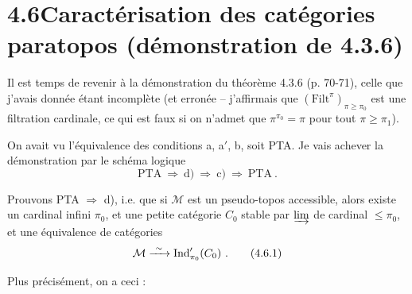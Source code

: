 \section*{4.6\quad Caractérisation des catégories paratopos (démonstration de 4.3.6)}

Il est temps de revenir à la démonstration du théorème 4.3.6 (p. 70-71), celle que j'avais donnée étant incomplète (et erronée – j'affirmais que $(\mathrm{Filt}^{\pi})_{\pi\geqslant\pi_0}$ est une filtration cardinale, ce qui est faux si on n'admet que $\pi^{\pi_0}=\pi$ pour tout $\pi\geqslant\pi_1$).

On avait vu l'équivalence des conditions a, a$'$, b, soit PTA. Je vais achever la démonstration par le schéma logique
\[
\text{PTA} \ \Longrightarrow\ \text{d)} \ \Longrightarrow\ \text{c)} \ \Longrightarrow\ \text{PTA}\ . \tag*{$(*)$}
\]

Prouvons PTA $\Longrightarrow$ d), i.e. que si $\mathcal{M}$ est un pseudo-topos accessible, alors existe un cardinal infini $\pi_0$, et une petite catégorie $C_0$ stable par $\varinjlim$ de cardinal $\leqslant\pi_0$, et une équivalence de catégories %
\[
\mathcal{M} \xrightarrow{\ \sim\ } \Ind'_{\pi_0}(C_0)\ . \tag*{(4.6.1)}
\]

Plus précisément, on a ceci :

